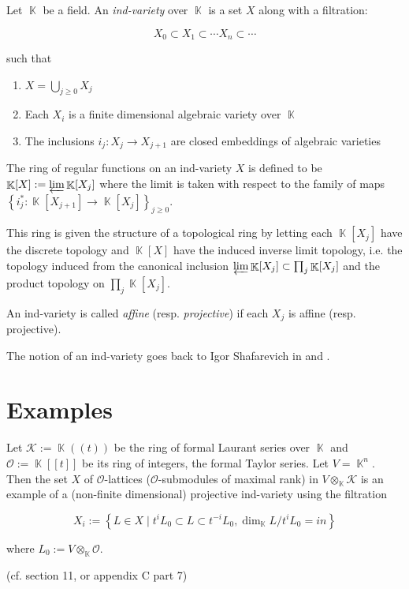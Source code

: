 \documentclass[12pt]{article}
\DeclareMathOperator{\K}{\mathbb{K}}
\begin{document}
Let $\K$ be a field. An \emph{ind-variety} over $\K$ is a set $X$ along with a
filtration:

\[ X_0 \subset X_1 \subset \cdots X_n \subset \cdots \]

such that

\begin{enumerate}
\item $X = \bigcup\limits_{j \ge 0} X_j$
\item Each $X_i$ is a finite dimensional algebraic variety over $\K$
\item The inclusions $i_j \colon X_j \to X_{j+1}$ are closed
embeddings of algebraic varieties
\end{enumerate}

The ring of regular functions on an ind-variety $X$ is defined to be
$\K [X] := \varprojlim \K [X_j]$ where the limit is taken
with respect to the family of maps $\left\{ i_j^* \colon
\K [X_{j+1}] \to \K [X_j] \right\}_{j \ge 0}$. 

This ring is given the structure of a topological ring by letting each
$\K [X_j]$ have the discrete topology and $\K [X]$ have the induced
inverse limit topology, i.e. the topology induced from the canonical
inclusion $\varprojlim \K [X_j] \subset \prod_j \K [X_j]$ and the
product topology on $\prod_j \K [X_j]$.

An ind-variety is called \emph{affine} (resp. \emph{projective}) if each
$X_j$ is affine (resp. projective).

The notion of an ind-variety goes back to Igor Shafarevich in \cite{S1} and \cite{S2}.

\section*{Examples}

Let $\mathcal{K} := \K ((t))$ be the ring of formal Laurant
series over $\K$ and $\mathcal{O} := \K [[t]]$ be its
ring of integers, the formal Taylor series. Let $V =
\K^n$. Then the set $X$ of $\mathcal{O}$-lattices ($\mathcal{O}$-submodules of maximal rank) in $V \otimes_{\K} \mathcal{K}$ is an example of a (non-finite
dimensional) projective ind-variety using the filtration

\[ X_i := \left\{ L \in X \mid t^i L_0 \subset L \subset t^{-i} L_0,
\dim_{\K} L/t^i L_0 = i n \right\} \]

where $L_0 := V \otimes_{\K} \mathcal{O}$.

(cf. \cite{L} section 11, or \cite{K} appendix C part 7)
\end{document}
